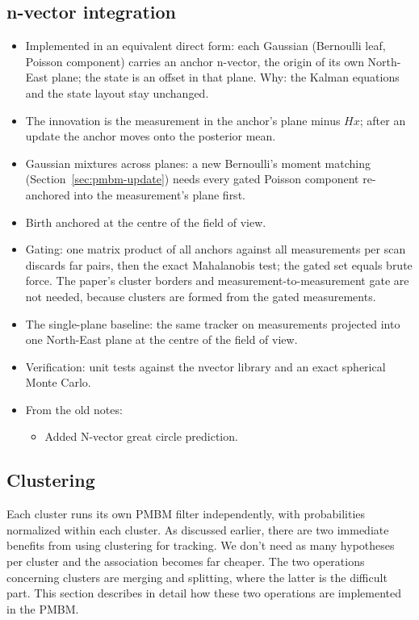 \subsection{n-vector integration}
\label{sec:impl-nvector}
\begin{itemize}
    \item Implemented in an equivalent direct form: each Gaussian (Bernoulli leaf, Poisson component) carries an anchor n-vector, the origin of its own North-East plane; the state is an offset in that plane. Why: the Kalman equations and the state layout stay unchanged.
    \item The innovation is the measurement in the anchor's plane minus $Hx$; after an update the anchor moves onto the posterior mean.
    \item Gaussian mixtures across planes: a new Bernoulli's moment matching (Section~\ref{sec:pmbm-update}) needs every gated Poisson component re-anchored into the measurement's plane first.
    \item Birth anchored at the centre of the field of view.
    \item Gating: one matrix product of all anchors against all measurements per scan discards far pairs, then the exact Mahalanobis test; the gated set equals brute force. The paper's cluster borders and measurement-to-measurement gate are not needed, because clusters are formed from the gated measurements.
    \item The single-plane baseline: the same tracker on measurements projected into one North-East plane at the centre of the field of view.
    \item Verification: unit tests against the nvector library and an exact spherical Monte Carlo.
    \item From the old notes:
    \begin{itemize}
    \item Added N-vector great circle prediction. 
    \end{itemize}
\end{itemize}

\subsection{Clustering}
\label{sec:impl-clustering}

Each cluster runs its own PMBM filter independently, with probabilities normalized within each cluster. As discussed earlier, there are two immediate benefits from using clustering for tracking. We don't need as many hypotheses per cluster and the association becomes far cheaper. The two operations concerning clusters are merging and splitting, where the latter is the difficult part. This section describes in detail how these two operations are implemented in the PMBM. 
\medskip


